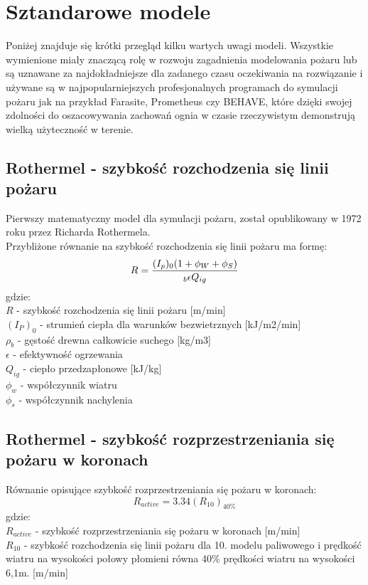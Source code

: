 \documentclass[a4paper, 11pt]{article}
\begin{document}
	\section* {Sztandarowe modele}
	\indent
	
	Poniżej znajduje się krótki przegląd kilku wartych uwagi modeli. Wszystkie wymienione miały znaczącą rolę w rozwoju zagadnienia modelowania pożaru lub są uznawane za najdokładniejsze dla zadanego czasu oczekiwania na rozwiązanie i używane są w najpopularniejszych profesjonalnych programach do symulacji pożaru jak na przykład Farasite, Prometheus czy BEHAVE, które dzięki swojej zdolności do oszacowywania zachowań ognia w czasie rzeczywistym demonstrują wielką użyteczność w terenie.
	\subsection{Rothermel - szybkość rozchodzenia się linii pożaru}
	\indent

	Pierwszy matematyczny model dla symulacji pożaru, został opublikowany w 1972 roku przez Richarda Rothermela.\\
	
	Przybliżone równanie na szybkość rozchodzenia się linii pożaru ma formę:
$$
R=\frac{(I_p)_{0}(1+\phi_W +\phi_S)}{_b\epsilon Q_{ig}}\\
$$
gdzie:\\
$R$	- szybkość rozchodzenia się linii pożaru	[m/min]\\
$(I_P)_0$	- 	strumień ciepła dla warunków bezwietrznych	[kJ/m2/min]\\
$\rho_b$	- 	gęstość drewna całkowicie suchego	[kg/m3]\\
$\epsilon$ 	- efektywność ogrzewania	\\
$Q_{ig}$	- 	ciepło przedzapłonowe	[kJ/kg]\\
$\phi_w$	- 	współczynnik wiatru	\\
$\phi_s$	- 	współczynnik nachylenia\\


\subsection{Rothermel - szybkość rozprzestrzeniania się pożaru w koronach}
\indent

Równanie opisujące szybkość rozprzestrzeniania się pożaru w koronach:
$$
R_{active}=3.34(R_10)_{40\%}
$$
gdzie: \\
$R_{active}$ - szybkość rozprzestrzeniania się pożaru w koronach [m/min]\\
$R_10$ - szybkość rozchodzenia się linii pożaru dla 10. modelu paliwowego i prędkość wiatru na wysokości połowy płomieni równa 40\% prędkości wiatru na wysokości 6,1m. [m/min]\\
\end{document}
